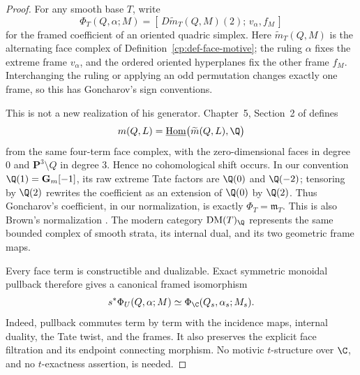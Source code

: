 \begin{proof}
For any smooth base \(T\), write
\[
 \Phi_T(Q,\alpha;M)
 =
 [\,D\widetilde m_T(Q,M)(2);\,v_\alpha,f_M\,]
\]
for the framed coefficient of an oriented quadric simplex.  Here
\(\widetilde m_T(Q,M)\) is the alternating face complex of
Definition~\ref{cp:def-face-motive}; the ruling \(\alpha\) fixes the extreme
frame \(v_\alpha\), and the ordered oriented hyperplanes fix the other
frame \(f_M\).  Interchanging the ruling or applying an odd permutation
changes exactly one frame, so this has Goncharov's sign conventions.

This is not a new realization of his generator.  Chapter~5, Section~2 of
\cite{Goncharov1999} defines
\[
 m(Q,L)=
 \underline{\operatorname{Hom}}\bigl(\widetilde m(Q,L),\Q\bigr)
\]
from the same four-term face complex, with the zero-dimensional faces in
degree \(0\) and \(\mathbf P^3\setminus Q\) in degree \(3\).  Hence no
cohomological shift occurs.  In our convention
\(\Q(1)=\Gm[-1]\), its raw extreme Tate factors are \(\Q(0)\) and
\(\Q(-2)\); tensoring by \(\Q(2)\) rewrites the coefficient as an extension
of \(\Q(0)\) by \(\Q(2)\).  Thus Goncharov's coefficient, in our
normalization, is exactly \(\Phi_T=\mathfrak m_T\).  This is also Brown's
normalization \cite[Definition~5.8]{Brown2013}.  The modern category
\(\DM(T)_\Q\) represents the same bounded complex of smooth strata, its
internal dual, and its two geometric frame maps.

Every face term is constructible and dualizable.  Exact symmetric monoidal
pullback therefore gives a canonical framed isomorphism
\begin{equation}
 s^*\Phi_U(Q,\alpha;M)
 \simeq
 \Phi_\C(Q_s,\alpha_s;M_s).
 \label{cp:eq-pullback-coefficient}
\end{equation}
Indeed, pullback commutes term by term with the incidence maps, internal
duality, the Tate twist, and the frames.  It also preserves the explicit
face filtration and its endpoint connecting morphism.  No motivic
\(t\)-structure over \(\C\), and no \(t\)-exactness assertion, is needed.


\end{proof}
